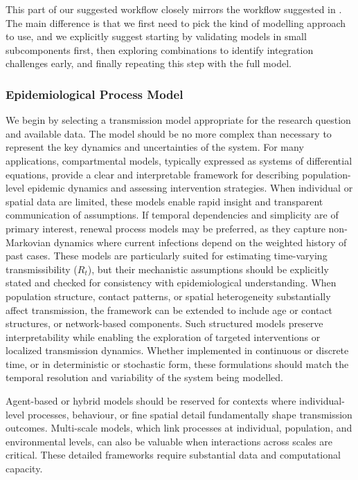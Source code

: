 \documentclass{article}
\begin{document}
This part of our suggested workflow closely mirrors the workflow suggested in \citet{gelman2020bayesian}.
The main difference is that we first need to pick the kind of modelling approach to use, and we explicitly suggest starting by validating models in small subcomponents first, then exploring combinations to identify integration challenges early, and finally repeating this step with the full model.

\subsubsection{Epidemiological Process Model}

We begin by selecting a transmission model appropriate for the research question and available data. The model should be no more complex than necessary to represent the key dynamics and uncertainties of the system. For many applications, compartmental models, typically expressed as systems of differential equations, provide a clear and interpretable framework for describing population-level epidemic dynamics and assessing intervention strategies. When individual or spatial data are limited, these models enable rapid insight and transparent communication of assumptions. If temporal dependencies and simplicity are of primary interest, renewal process models may be preferred, as they capture non-Markovian dynamics where current infections depend on the weighted history of past cases. These models are particularly suited for estimating time-varying transmissibility ($R_t$), but their mechanistic assumptions should be explicitly stated and checked for consistency with epidemiological understanding.  When population structure, contact patterns, or spatial heterogeneity substantially affect transmission, the framework can be extended to include age or contact structures, or network-based components. Such structured models preserve interpretability while enabling the exploration of targeted interventions or localized transmission dynamics.
Whether implemented in continuous or discrete time, or in deterministic or stochastic form, these formulations should match the temporal resolution and variability of the system being modelled. 

Agent-based or hybrid models should be reserved for contexts where individual-level processes, behaviour, or fine spatial detail fundamentally shape transmission outcomes. Multi-scale models, which link processes at individual, population, and environmental levels, can also be valuable when interactions across scales are critical. These detailed frameworks require substantial data and computational capacity.
\end{document}
